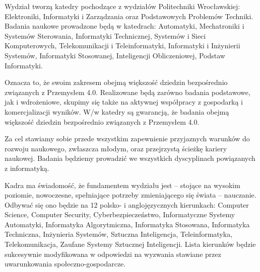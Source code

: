 Wydział tworzą katedry pochodzące z wydziałów Politechniki Wrocławskiej: Elektroniki, Informatyki i Zarządzania oraz Podstawowych Problemów Techniki.
Badania naukowe prowadzone będą w katedrach: Automatyki, Mechatroniki i Systemów Sterowania, Informatyki Technicznej, Systemów i Sieci Komputerowych, Telekomunikacji i Teleinformatyki, Informatyki i Inżynierii Systemów, Informatyki Stosowanej, Inteligencji Obliczeniowej, Podstaw Informatyki.

Oznacza to, że swoim zakresem obejmą większość dziedzin bezpośrednio związanych z Przemysłem 4.0. Realizowane będą zarówno badania podstawowe, jak i wdrożeniowe, skupimy się także na aktywnej współpracy z gospodarką i komercjalizacji wyników. W/w katedry są gwarancją, że badania obejmą większość dziedzin bezpośrednio związanych z Przemysłem 4.0.

Za cel stawiamy sobie przede wszystkim zapewnienie przyjaznych warunków do rozwoju naukowego, zwłaszcza młodym, oraz przejrzystą ścieżkę kariery naukowej. Badania będziemy prowadzić we wszystkich dyscyplinach powiązanych z informatyką.

Kadra ma świadomość, że fundamentem wydziału jest – stojące na wysokim poziomie, nowoczesne, spełniające potrzeby zmieniającego się świata – nauczanie. Odbywać się ono będzie na 12 polsko- i anglojęzycznych kierunkach: Computer Science, Computer Security, Cyberbezpieczeństwo, Informatyczne Systemy Automatyki, Informatyka Algorytmiczna, Informatyka Stosowana, Informatyka Techniczna, Inżynieria Systemów, Sztuczna Inteligencja, Teleinformatyka, Telekomunikacja, Zaufane Systemy Sztucznej Inteligencji. Lista kierunków będzie sukcesywnie modyfikowana w odpowiedzi na wyzwania stawiane przez uwarunkowania społeczno-gospodarcze.